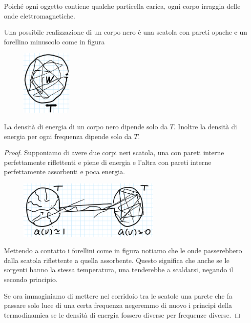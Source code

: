 \begin{remark}
Poich\'e ogni oggetto contiene qualche particella carica, ogni corpo irraggia delle onde elettromagnetiche.
\end{remark}


\noindent
Una possibile realizzazione di un corpo nero \`e una scatola con pareti opache e un forellino minuscolo come in figura

\begin{figure}[!htb]
    \centering
    \includegraphics[width=2.5cm]{images/corpo_nero_scatola.png}
\end{figure}

\begin{proposition}
La densit\`a di energia di un corpo nero dipende solo da $T$. Inoltre la densit\`a di energia per ogni frequenza dipende solo da $T$.
\end{proposition}
\begin{proof}
Supponiamo di avere due corpi neri scatola, una con pareti interne perfettamente riflettenti e piene di energia e l'altra con pareti interne perfettamente assorbenti e poca energia.

\begin{figure}[!htb]
    \centering
    \includegraphics[width=7cm]{images/dimostrazione_w_dipende_solo_da_T.png}
\end{figure}

\noindent
Mettendo a contatto i forellini come in figura notiamo che le onde passerebbero dalla scatola riflettente a quella assorbente. Questo significa che anche se le sorgenti hanno la stessa temperatura, una tenderebbe a scaldarsi, negando il secondo principio.
\bigskip

\noindent
Se ora immaginiamo di mettere nel corridoio tra le scatole una parete che fa passare solo luce di una certa frequenza negeremmo di nuovo i principi della termodinamica se le densit\`a di energia fossero diverse per frequenze diverse.
\end{proof}

